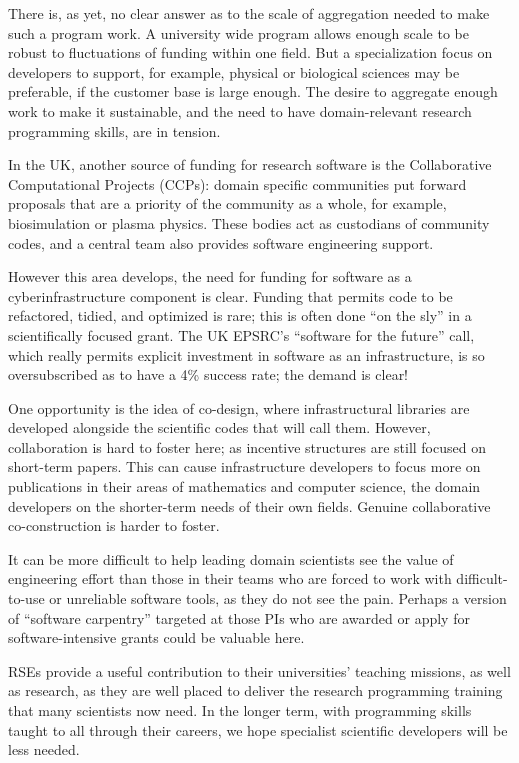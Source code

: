 There is, as yet, no clear answer as to the scale of aggregation needed to make
such a program work. A university wide program allows enough scale to be robust
to fluctuations of funding within one field. But a specialization focus on
developers to support, for example, physical or biological sciences may be
preferable, if the customer base is large enough. The desire to aggregate enough
work to make it sustainable, and the need to have domain-relevant research
programming skills, are in tension.

In the UK, another source of funding for research software is the
Collaborative Computational Projects (CCPs): domain specific communities put
forward proposals that are a priority of the community as a whole, for example,
biosimulation or plasma physics. These bodies act as custodians of community
codes, and a central team also provides software engineering support.

However this area develops, the need for funding for software as a
cyberinfrastructure component is clear.  Funding that permits code to be
refactored, tidied, and optimized is rare; this is often done ``on the sly'' in a
scientifically focused grant. The UK EPSRC's ``software for the future'' call,
which really permits explicit investment in software as an infrastructure, is so
oversubscribed as to have a 4\% success rate; the demand is clear!

One opportunity is the idea of co-design, where infrastructural libraries are
developed alongside the scientific codes that will call them. However,
collaboration is hard to foster here; as incentive structures are still focused
on short-term papers. This can cause infrastructure developers to focus more on
publications in their areas of mathematics and computer science, the domain
developers on the shorter-term needs of their own fields. Genuine collaborative
co-construction is harder to foster.

It can be more difficult to help leading domain scientists see the value of
engineering effort than those in their teams who are forced to work with
difficult-to-use or unreliable software tools, as they do not see the pain.
Perhaps a version of ``software carpentry'' targeted at those PIs who are
awarded or apply for software-intensive grants could be valuable here.

RSEs provide a useful contribution to their universities' teaching missions, as
well as research, as they are well placed to deliver the research programming
training that many scientists now need. In the longer term, with programming
skills taught to all through their careers, we hope specialist scientific
developers will be less needed.

